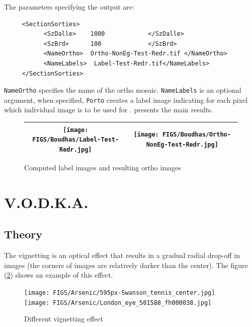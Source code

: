 The parameters specifying the output are:

{\scriptsize
\begin{verbatim}
     <SectionSorties>
           <SzDalle>    1000            </SzDalle>
           <SzBrd>      100             </SzBrd>
           <NameOrtho>  Ortho-NonEg-Test-Redr.tif </NameOrtho>
           <NameLabels>  Label-Test-Redr.tif</NameLabels>
     </SectionSorties>
\end{verbatim}
}

{\tt NameOrtho} specifies the name of the ortho mosaic. {\tt NameLabels} is an optional
argument, when specified, {\tt Porto} creates a label image indicating for each pixel which
individual  image is to be used for .   %
presents the main results.


\begin{figure}
\begin{tabular}{||c|c||}
   \hline \hline
   \texttt{[image: FIGS/Boudhas/Label-Test-Redr.jpg]}   &
   \texttt{[image: FIGS/Boudhas/Ortho-NonEg-Test-Redr.jpg]}   \\ \hline  \hline
\end{tabular}
\label{Resul:Ortho}
\caption{Computed label images and resulting ortho images}
\end{figure}




\section{V.O.D.K.A.}
\label{V.O.D.K.A.}

\subsection{Theory}

The vignetting is an optical effect that results in a gradual radial drop-off in images (the corners of images are relatively darker than the center). The figure (\ref{image_vignette}) shows an example of this effect.

\begin{figure}[htb]
\centering
\texttt{[image: FIGS/Arsenic/595px-Swanson\_tennis\_center.jpg]}
\texttt{[image: FIGS/Arsenic/London\_eye\_501588\_fh000038.jpg]}
\caption{
Different vignetting effect
}
\label{image_vignette}
\end{figure}

